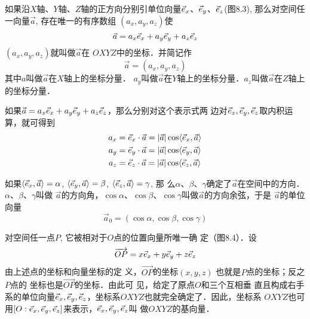 \begin{figure}[htp]
    \centering
{}
    \caption{}
\end{figure}


如果沿$X$轴、$Y$轴、$Z$轴的正方向分别引单位向量$\vec{e}_x$、$\vec{e}_y$、$\vec{e}_z$(图8.3), 那么对空间任一向量$\vec{a}$, 存在唯一的有序数组
$(a_x,a_y,a_z)$使
\[\vec{a}=a_x\vec{e}_x+a_y\vec{e}_y+a_z\vec{e}_z\]
$(a_x,a_y,a_z)$就叫做$\vec{a}$在
$OXYZ$中的坐标．并简记作
\[\vec{a}=(a_x,a_y,a_z)\]
其中$a$叫做$\vec{a}$在$X$轴上的坐标分量．
$a_y$叫做$\vec{a}$在$Y$轴上的坐标分量．$a_z$叫做$\vec{a}$在$Z$轴上的坐标分量．

如果$\vec{a}=a_x\vec{e}_x+a_y\vec{e}_y+a_z\vec{e}_z$，那么分别对这个表示式两
边对$\vec{e}_x,\vec{e}_y,\vec{e}_z$取内积运算，就可得到
\[\begin{split}
    a_x&=\vec{e}_x\cdot \vec{a}=|\vec{a}|\cos\langle \vec{e}_x,\vec{a} \rangle \\
    a_y&=\vec{e}_y\cdot \vec{a}=|\vec{a}|\cos\langle \vec{e}_y,\vec{a} \rangle \\
    a_z&=\vec{e}_z\cdot \vec{a}=|\vec{a}|\cos\langle \vec{e}_z,\vec{a} \rangle \\
\end{split}\]

如果$\langle \vec{e}_x,\vec{a} \rangle=\alpha$, $\langle \vec{e}_y,\vec{a} \rangle=\beta$, $\langle \vec{e}_z,\vec{a} \rangle=\gamma$, 那
么$\alpha$、$\beta$、$\gamma$确定了$\vec{a}$在空间中的方向．$\alpha$、$\beta$、$\gamma$叫做
$\vec{a}$的方向角，$\cos\alpha$、$\cos\beta$、$\cos\gamma$叫做$\vec{a}$的方向余弦，于是
$\vec{a}$的单位向量
\[\vec{a}_0=(\cos\alpha, \cos\beta, \cos\gamma)\]

对空间任一点$P$, 它被相对于$O$点的位置向量所唯一确
定（图8.4）．设
\[\overrightarrow{OP}=x\vec{e}_x+y\vec{e}_y+z\vec{e}_z\]
由上述点的坐标和向量坐标的定
义，$\Vec{OP}$的坐标$(x,y,z)$
也就是$P$点的坐标；反之$P$点的
坐标也是$\Vec{OP}$的坐标．由此可
见，给定了原点$O$和三个互相垂
直且构成右手系的单位向量$\vec{e}_x,\vec{e}_y,\vec{e}_z$，坐标系$OXYZ$也就完全确定了．因此，坐标系
$OXYZ$也可用$[O:\vec{e}_x,\vec{e}_y,\vec{e}_z]$来表示，$\vec{e}_x,\vec{e}_y,\vec{e}_z$叫
做$OXYZ$的基向量．

